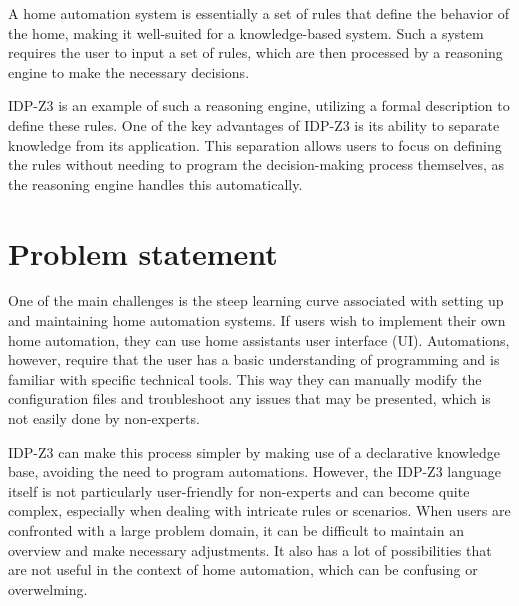 \documentclass[11pt,a4paper]{report}
\begin{document}
A home automation system is essentially a set of rules that define the behavior of the home, making it well-suited for a knowledge-based system. Such a system requires the user to input a set of rules, which are then processed by a reasoning engine to make the necessary decisions.

IDP-Z3 is an example of such a reasoning engine, utilizing a formal description to define these rules. One of the key advantages of IDP-Z3 is its ability to separate knowledge from its application. This separation allows users to focus on defining the rules without needing to program the decision-making process themselves, as the reasoning engine handles this automatically.

\section{Problem statement}
One of the main challenges is the steep learning curve associated with setting up and maintaining home automation systems. If users wish to implement their own home automation, they can use home assistants user interface (UI). Automations, however, require that the user has a basic understanding of programming and is familiar with specific technical tools. This way they can manually modify the configuration files and troubleshoot any issues that may be presented, which is not easily done by non-experts.

IDP-Z3 can make this process simpler by making use of a declarative knowledge base, avoiding the need to program automations. However, the IDP-Z3 language itself is not particularly user-friendly for non-experts and can become quite complex, especially when dealing with intricate rules or scenarios. When users are confronted with a large problem domain, it can be difficult to maintain an overview and make necessary adjustments. It also has a lot of possibilities that are not useful in the context of home automation, which can be confusing or overwelming.
\end{document}
